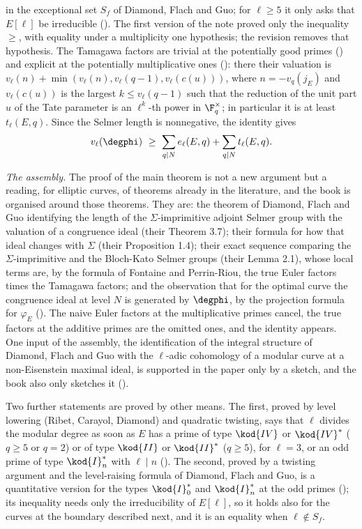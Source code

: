 in the exceptional set $S_f$ of Diamond, Flach and Guo; for $\ell\ge5$ it only asks that $E[\ell]$
be irreducible (). The first version of the note proved only the
inequality $\ge$, with equality under a multiplicity one hypothesis; the revision removes that
hypothesis. The Tamagawa factors are trivial at the potentially good primes
() and explicit at the potentially multiplicative ones
(): there their valuation is
$v_\ell(n)+\min(v_\ell(n),v_\ell(q-1),v_\ell(c(u)))$, where $n=-v_q(j_E)$ and $v_\ell(c(u))$ is
the largest $k\le v_\ell(q-1)$ such that the reduction of the unit part $u$ of the Tate parameter
is an $\ell^k$-th power in $\F_q^\times$; in particular it is at least $t_\ell(E,q)$. Since the Selmer length is
nonnegative, the identity gives
\[
v_\ell(\degphi)\ \ge\ \sum_{q\mid N}e_\ell(E,q)+\sum_{q\mid N}t_\ell(E,q).
\]

\emph{The assembly.} The proof of the main theorem is not a new argument but a reading, for
elliptic curves, of theorems already in the literature, and the book is organised around those
theorems. They are: the theorem of Diamond, Flach and Guo identifying the length of the
$\Sigma$-imprimitive adjoint Selmer group with the valuation of a congruence ideal (their Theorem
3.7); their formula for how that ideal changes with $\Sigma$ (their Proposition 1.4); their exact
sequence comparing the $\Sigma$-imprimitive and the Bloch-Kato Selmer groups (their Lemma 2.1),
whose local terms are, by the formula of Fontaine and Perrin-Riou, the true Euler factors times the
Tamagawa factors; and the observation that for the optimal curve the congruence ideal at level $N$
is generated by $\degphi$, by the projection formula for $\varphi_E$
(). The naive Euler factors at the multiplicative primes
cancel, the true factors at the additive primes are the omitted ones, and the identity appears.
One input of the assembly, the identification of the integral structure of Diamond, Flach and Guo
with the $\ell$-adic cohomology of a modular curve at a non-Eisenstein maximal ideal, is supported
in the paper only by a sketch, and the book also only sketches it ().

Two further statements are proved by other means. The first, proved by level lowering (Ribet,
Carayol, Diamond) and quadratic twisting, says that $\ell$ divides the modular degree as soon as
$E$ has a prime of type $\kod{IV}$ or $\kod{IV}^*$ ($q\ge5$ or $q=2$) or of type $\kod{II}$ or
$\kod{II}^*$ ($q\ge5$), for $\ell=3$, or an odd prime of type $\kod{I}_n^*$ with $\ell\mid n$
(). The second, proved by a twisting argument and the level-raising
formula of Diamond, Flach and Guo, is a quantitative version for the types $\kod{I}_0^*$ and
$\kod{I}_n^*$ at the odd primes (); its inequality needs only the
irreducibility of $E[\ell]$, so it holds also for the curves at the boundary described next, and it
is an equality when $\ell\notin S_f$.

